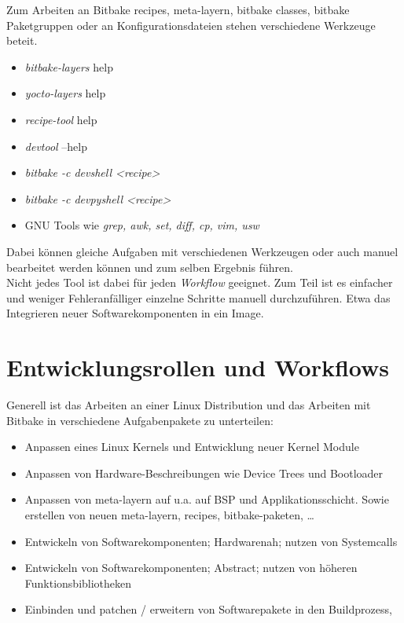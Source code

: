     Zum Arbeiten an Bitbake recipes, meta-layern, bitbake classes,
        bitbake Paketgruppen oder an Konfigurationsdateien stehen verschiedene
Werkzeuge beteit.
        \begin{itemize}
            \item \textit{bitbake-layers} help
            \item \textit{yocto-layers } help
            \item \textit{recipe-tool} help
            \item \textit{devtool } --help
            \item \textit{bitbake -c devshell <recipe>}
            \item \textit{bitbake -c devpyshell <recipe>}
            \item GNU Tools wie \textit{grep, awk, set, diff, cp, vim, usw}
        \end{itemize}
         Dabei können gleiche Aufgaben mit verschiedenen Werkzeugen oder auch
         manuel bearbeitet werden können und zum selben Ergebnis führen.\\

         Nicht jedes Tool ist dabei für jeden \textit{Workflow} geeignet. Zum
         Teil ist es einfacher und weniger Fehleranfälliger einzelne Schritte manuell
durchzuführen. Etwa das Integrieren neuer Software\-komponenten in ein Image.





\section{Entwicklungsrollen und Workflows}%
\label{sec:workflows}
Generell ist das Arbeiten an einer Linux Distribution und das Arbeiten mit
Bitbake in verschiedene Aufgabenpakete zu unterteilen:
\begin{itemize}
    \item Anpassen eines Linux Kernels und Entwicklung neuer Kernel Module
    \item Anpassen von Hardware-Beschreibungen wie Device Trees und Bootloader
    \item Anpassen von meta-layern auf u.a. auf BSP und Applikationsschicht.
        Sowie erstellen von neuen meta-layern, recipes, bitbake-paketen, \ldots
    \item Entwickeln von Softwarekomponenten; Hardwarenah; nutzen von
        Systemcalls
    \item Entwickeln von Softwarekomponenten; Abstract; nutzen von höheren
        Funktionsbibliotheken
    \item Einbinden und patchen / erweitern von Softwarepakete in den Buildprozess,
\end{itemize}

